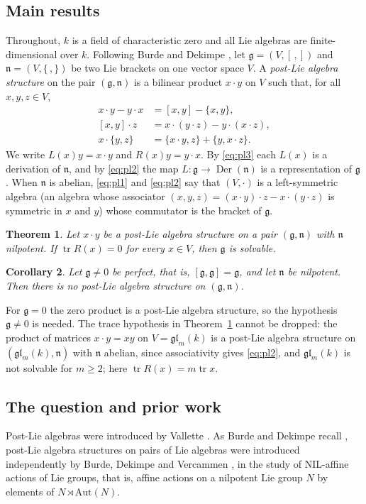 \documentclass[11pt]{article}
\newtheorem{theorem}{Theorem}[section]
\newtheorem{corollary}[theorem]{Corollary}
\theoremstyle{definition}
\theoremstyle{remark}
\newcommand{\g}{\mathfrak{g}}
\newcommand{\n}{\mathfrak{n}}
\DeclareMathOperator{\tr}{tr}
\DeclareMathOperator{\Der}{Der}
\begin{document}
\subsection{Main results}
Throughout, $k$ is a field of characteristic zero and all Lie algebras
are finite-dimensional over $k$. Following Burde and Dekimpe
\cite[Definition 2.1]{BD}, let $\g=(V,[\,,])$ and $\n=(V,\{\,,\})$ be two
Lie brackets on one vector space $V$. A \emph{post-Lie algebra structure}
on the pair $(\g,\n)$ is a bilinear product $x\cdot y$ on $V$ such that,
for all $x,y,z\in V$,
\begin{align}
x\cdot y-y\cdot x&=[x,y]-\{x,y\},\label{eq:pl1}\\
[x,y]\cdot z&=x\cdot(y\cdot z)-y\cdot(x\cdot z),\label{eq:pl2}\\
x\cdot\{y,z\}&=\{x\cdot y,z\}+\{y,x\cdot z\}.\label{eq:pl3}
\end{align}
We write $L(x)y=x\cdot y$ and $R(x)y=y\cdot x$. By \eqref{eq:pl3} each
$L(x)$ is a derivation of $\n$, and by \eqref{eq:pl2} the map
$L\colon\g\to\Der(\n)$ is a representation of $\g$ \cite[\S2]{BD}. When
$\n$ is abelian, \eqref{eq:pl1} and \eqref{eq:pl2} say that $(V,\cdot)$ is
a left-symmetric algebra (an algebra whose associator
$(x,y,z)=(x\cdot y)\cdot z-x\cdot(y\cdot z)$ is symmetric in $x$ and $y$)
whose commutator is the bracket of $\g$.

\begin{theorem}\label{thm:main}
Let $x\cdot y$ be a post-Lie algebra structure on a pair $(\g,\n)$ with
$\n$ nilpotent. If $\tr R(x)=0$ for every $x\in V$, then $\g$ is
solvable.
\end{theorem}

\begin{corollary}\label{cor:perfect}
Let $\g\neq0$ be perfect, that is, $[\g,\g]=\g$, and let $\n$ be
nilpotent. Then there is no post-Lie algebra structure on $(\g,\n)$.
\end{corollary}

For $\g=0$ the zero product is a post-Lie algebra structure, so the
hypothesis $\g\ne0$ is needed. The trace hypothesis in
Theorem~\ref{thm:main} cannot be dropped: the product of matrices
$x\cdot y=xy$ on $V=\mathfrak{gl}_m(k)$ is a post-Lie algebra structure on
$(\mathfrak{gl}_m(k),\n)$ with $\n$ abelian, since associativity gives
\eqref{eq:pl2}, and $\mathfrak{gl}_m(k)$ is not solvable for $m\ge2$; here
$\tr R(x)=m\tr x$.

\subsection{The question and prior work}
Post-Lie algebras were introduced by Vallette \cite{Va}. As Burde and
Dekimpe recall \cite[\S1]{BD}, post-Lie algebra structures on pairs of Lie
algebras were introduced independently by Burde, Dekimpe and Vercammen
\cite{BDV}, in the study of NIL-affine actions of Lie groups, that is,
affine actions on a nilpotent Lie group $N$ by elements of
$N\rtimes\mathrm{Aut}(N)$.
\end{document}
